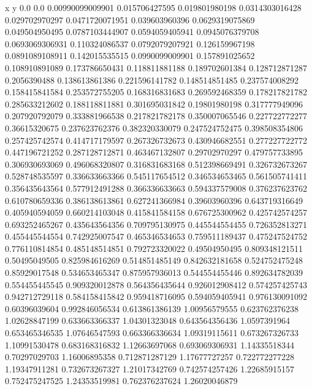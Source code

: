               x                y
            0.0              0.0
0.00990099009901   0.015706427595
 0.019801980198  0.0314303016428
 0.029702970297  0.0471720071951
 0.039603960396  0.0629319075869
 0.049504950495  0.0787103444907
0.0594059405941  0.0945076379708
0.0693069306931   0.110324086537
0.0792079207921   0.126159967198
0.0891089108911   0.142015535515
0.0990099009901   0.157891025652
 0.108910891089   0.173786650431
 0.118811881188   0.189702601384
 0.128712871287     0.2056390488
 0.138613861386   0.221596141782
 0.148514851485   0.237574008292
 0.158415841584   0.253572755205
 0.168316831683   0.269592468359
 0.178217821782   0.285633212602
 0.188118811881   0.301695031842
  0.19801980198   0.317777949096
 0.207920792079   0.333881966538
 0.217821782178   0.350007065546
 0.227722772277    0.36615320675
 0.237623762376   0.382320330079
 0.247524752475   0.398508354806
 0.257425742574   0.414717179597
 0.267326732673   0.430946682551
 0.277227722772   0.447196721252
 0.287128712871   0.463467132807
  0.29702970297   0.479757733895
 0.306930693069   0.496068320807
 0.316831683168   0.512398669491
 0.326732673267   0.528748535597
 0.336633663366   0.545117654512
 0.346534653465   0.561505741411
 0.356435643564   0.577912491288
 0.366336633663   0.594337579008
 0.376237623762   0.610780659336
 0.386138613861   0.627241366984
  0.39603960396   0.643719316649
 0.405940594059   0.660214103048
 0.415841584158   0.676725300962
 0.425742574257   0.693252465267
 0.435643564356   0.709795130975
 0.445544554455   0.726352813271
 0.455445544554   0.742925007547
 0.465346534653   0.759511189437
 0.475247524752   0.776110814854
 0.485148514851   0.792723320022
  0.49504950495   0.809348121511
  0.50495049505   0.825984616269
 0.514851485149   0.842632181658
 0.524752475248    0.85929017548
 0.534653465347   0.875957936013
 0.544554455446   0.892634782039
 0.554455445545   0.909320012878
 0.564356435644   0.926012908412
 0.574257425743   0.942712729118
 0.584158415842   0.959418716095
 0.594059405941   0.976130091092
  0.60396039604   0.992846056534
 0.613861386139    1.00956579555
 0.623762376238    1.02628847199
 0.633663366337    1.04301323048
 0.643564356436     1.0597391964
 0.653465346535    1.07646547593
 0.663366336634    1.09319115611
 0.673267326733    1.10991530478
 0.683168316832    1.12663697068
 0.693069306931    1.14335518344
  0.70297029703    1.16006895358
 0.712871287129    1.17677727257
 0.722772277228    1.19347911281
 0.732673267327    1.21017342769
 0.742574257426    1.22685915157
 0.752475247525    1.24353519981
 0.762376237624    1.26020046879
